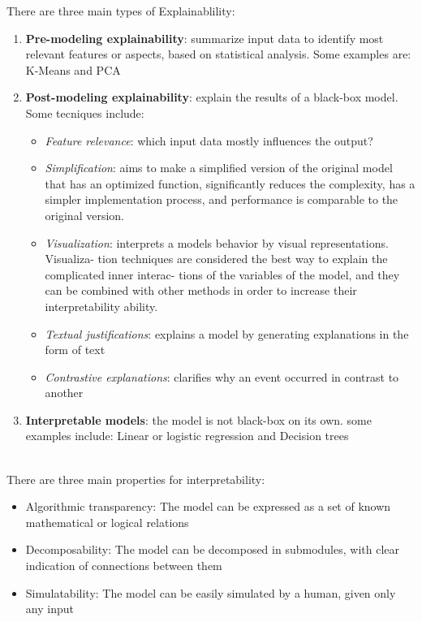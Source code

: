 \begin{minipage}[c]{0.5\textwidth}
    There are three main types of Explainablility:
    \begin{enumerate}
        \item \textbf{Pre-modeling explainability}: summarize input data to identify most relevant features or aspects, based on statistical analysis. Some examples are: K-Means and PCA
        \item \textbf{Post-modeling explainability}: explain the results of a black-box model. Some tecniques include: 
        \begin{itemize}
            \item \emph{Feature relevance}: which input data mostly influences the output?
            \item \emph{Simplification}: aims to make a simplified version of the original model that has an
            optimized function, significantly reduces the complexity, has a simpler implementation
            process, and performance is comparable to the original version.
            \item \emph{Visualization}: interprets a models behavior by visual representations. Visualiza-
            tion techniques are considered the best way to explain the complicated inner interac-
            tions of the variables of the model, and they can be combined with other methods in
            order to increase their interpretability ability.
            \item \emph{Textual justifications}: explains a model by generating explanations in the form of
            text
            \item \emph{Contrastive explanations}: clarifies why an event occurred in contrast to another
        \end{itemize}
        \item \textbf{Interpretable models}: the model is not black-box on its own. some examples include: Linear or logistic regression and Decision trees
    \end{enumerate}
\end{minipage}\\

There are three main properties for interpretability:
\begin{itemize}
    \item Algorithmic transparency: The model can be expressed as a set of known mathematical or logical relations
    \item Decomposability: The model can be decomposed in submodules, with clear indication of connections between them
    \item Simulatability: The model can be easily simulated by a human, given only any input
\end{itemize}